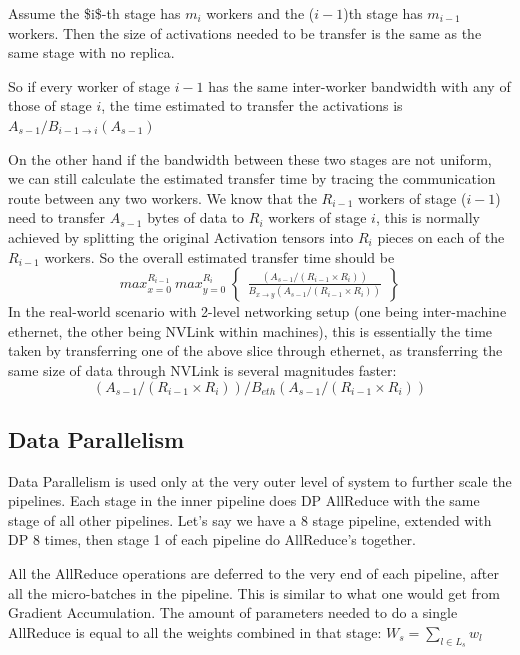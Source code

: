 \documentclass[11pt]{article}
\begin{document}
Assume the \$i\$-th stage has \(m_i\) workers and the (\(i-1\))th stage has \(m_{i-1}\) workers. Then the size of activations needed to be transfer is the same as the same stage with no replica. 

So if every worker of stage \(i-1\)  has the same inter-worker bandwidth with any of those of stage \(i\), the time estimated to transfer the activations is \(A_{s-1} / B_{i-1 \to i}(A_{s-1})\)

On the other hand if the bandwidth between these two stages are not uniform, we can still calculate the estimated transfer time by tracing the communication route between any two workers.
We know that the \(R_{i-1}\) workers of stage (\(i-1\)) need to transfer \(A_{s-1}\) bytes of data to \(R_i\) workers of stage \(i\), this is normally achieved by splitting the original Activation tensors into \(R_i\) pieces on each of the \(R_{i-1}\) workers. So the overall estimated transfer time should be 
$$max_{x=0}^{R_{i-1}}\ max_{y=0}^{R_i}\ \left\{\begin{array}{lr}
   \frac{(A_{s-1}/(R_{i-1} \times R_i))}{B_{x \to y}(A_{s-1}/(R_{i-1} \times R_i))}
   \end{array}\right\}$$
In the real-world scenario with 2-level networking setup (one being inter-machine ethernet, the other being NVLink within machines), this is essentially the time taken by transferring one of the above slice through ethernet, as transferring the same size of data through NVLink is several magnitudes faster: 
$$(A_{s-1}/(R_{i-1} \times R_i)) / B_{eth}(A_{s-1}/(R_{i-1}\times R_i))$$

\subsection{Data Parallelism}
\label{sec:orga9f34e1}

Data Parallelism is used only at the very outer level of system to further scale the pipelines. Each stage in the inner pipeline does DP AllReduce with the same stage of all other pipelines. Let's say we have a 8 stage pipeline, extended with DP 8 times, then stage 1 of each pipeline do AllReduce's together. 

All the AllReduce operations are deferred to the very end of each pipeline, after all the micro-batches in the pipeline. This is similar to what one would get from Gradient Accumulation. The amount of parameters needed to do a single AllReduce is equal to all the weights combined in that stage: \(W_s = \sum_{l \in L_s} w_l\)
\end{document}
